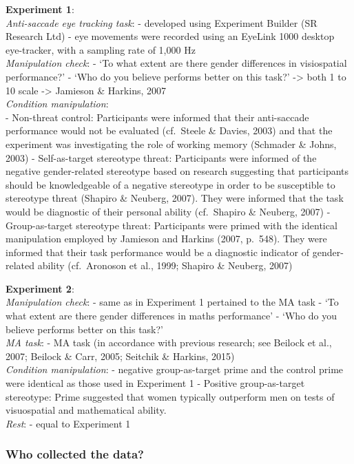 \documentclass[
  doc, a4paper]{apa7}
\begin{document}
\textbf{Experiment 1}:\\
\emph{Anti-saccade eye tracking task}:
- developed using Experiment Builder (SR Research Ltd)
- eye movements were recorded using an EyeLink 1000 desktop eye-tracker, with a sampling rate of 1,000 Hz\\
\emph{Manipulation check}:
- `To what extent are there gender differences in visiospatial performance?'
- `Who do you believe performs better on this task?'
-\textgreater{} both 1 to 10 scale
-\textgreater{} Jamieson \& Harkins, 2007\\
\emph{Condition manipulation}:\\
- Non-threat control: Participants were informed that their anti-saccade performance would not be evaluated (cf.~Steele \& Davies, 2003) and that the experiment was investigating the role of working memory (Schmader \& Johns, 2003)
- Self-as-target stereotype threat: Participants were informed of the negative gender-related stereotype based on research suggesting that participants should be knowledgeable of a negative stereotype in order to be susceptible to stereotype threat (Shapiro \& Neuberg, 2007). They were informed that the task would be diagnostic of their personal ability (cf.~Shapiro \& Neuberg, 2007)
- Group-as-target stereotype threat: Participants were primed with the identical manipulation employed by Jamieson and Harkins (2007, p.~548). They were informed that their task performance would be a diagnostic indicator of gender-related ability (cf.~Aronoson et al., 1999; Shapiro \& Neuberg, 2007)

\textbf{Experiment 2}:\\
\emph{Manipulation check}:
- same as in Experiment 1 pertained to the MA task
- `To what extent are there gender differences in maths performance'
- `Who do you believe performs better on this task?'\\
\emph{MA task}:
- MA task (in accordance with previous research; see Beilock et al., 2007; Beilock \& Carr, 2005; Seitchik \& Harkins, 2015)\\
\emph{Condition manipulation}:
- negative group-as-target prime and the control prime were identical as those used in Experiment 1
- Positive group-as-target stereotype: Prime suggested that women typically outperform men on tests of visuospatial and mathematical ability.\\
\emph{Rest}:
- equal to Experiment 1

\subsubsection{Who collected the data?}\label{who-collected-the-data}
\end{document}
